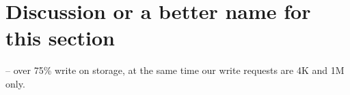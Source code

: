 \section{Discussion or a better name for this section}
\label{sec:discuss} 

-- over 75\% write on storage, at the same time our write requests are 4K and 1M only. 
